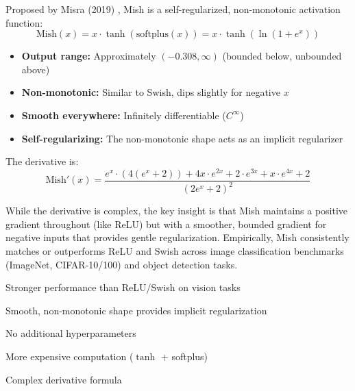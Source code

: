 Proposed by Misra (2019) \cite{misra2019mish}, Mish is a self-regularized, non-monotonic activation function:
\begin{equation}
\text{Mish}(x) = x \cdot \tanh(\text{softplus}(x)) = x \cdot \tanh(\ln(1 + e^x))
\end{equation}

\begin{properties}
\begin{itemize}
    \item \textbf{Output range:} Approximately $(-0.308, \infty)$ (bounded below, unbounded above)
    \item \textbf{Non-monotonic:} Similar to Swish, dips slightly for negative $x$
    \item \textbf{Smooth everywhere:} Infinitely differentiable ($C^\infty$)
    \item \textbf{Self-regularizing:} The non-monotonic shape acts as an implicit regularizer
\end{itemize}
\end{properties}

The derivative is:
\begin{equation}
\text{Mish}'(x) = \frac{e^x \cdot (4(e^x + 2)) + 4x \cdot e^{2x} + 2 \cdot e^{3x} + x \cdot e^{4x} + 2}{(2e^x + 2)^2}
\end{equation}

While the derivative is complex, the key insight is that Mish maintains a positive gradient throughout (like ReLU) but with a smoother, bounded gradient for negative inputs that provides gentle regularization. Empirically, Mish consistently matches or outperforms ReLU and Swish across image classification benchmarks (ImageNet, CIFAR-10/100) and object detection tasks.

\begin{advantages}
    \item Stronger performance than ReLU/Swish on vision tasks
    \item Smooth, non-monotonic shape provides implicit regularization
    \item No additional hyperparameters
\end{advantages}

\begin{disadvantages}
    \item More expensive computation ($\tanh$ + softplus)
    \item Complex derivative formula
\end{disadvantages}

